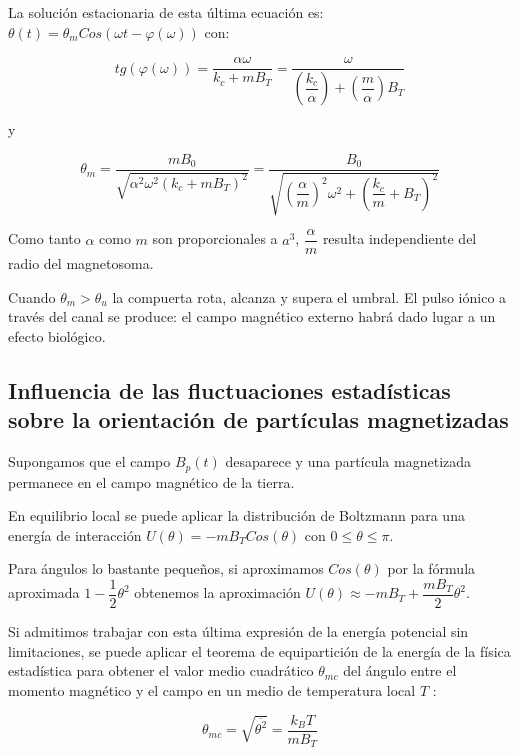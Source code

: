 La solución estacionaria de esta última ecuación es: $\theta(t)=\theta_{m}Cos(\omega t - \varphi(\omega))$ con:

\begin{equation*}
	\label{eq:64}
	tg\left(\varphi(\omega) \right) = \dfrac{\alpha\omega}{k_{c}+mB_{T}}
	=\dfrac{\omega}{\left( \dfrac{k_{c}}{\alpha}\right) +\left( \dfrac{m}{\alpha}\right) B_{T}}
\end{equation*}

y

\begin{equation*}
	\label{eq:65}
	\theta_{m} = \dfrac{mB_{0}}{\sqrt{\alpha^{2}\omega^{2}(k_{c}+mB_{T})^{2}}}
	=\dfrac{B_{0}}{\sqrt{\left( \dfrac{\alpha}{m}\right) ^{2}\omega^{2}+\left( \dfrac{k_{c}}{m}+B_{T}\right) ^{2}}}
\end{equation*}

Como tanto $\alpha$ como $m$ son proporcionales a $a^{3}$, $\dfrac{\alpha}{m}$ resulta independiente del radio del magnetosoma.

Cuando $\theta_{m}>\theta_{u}$ la compuerta rota, alcanza y supera el umbral. El pulso iónico a través del canal se produce: el campo magnético externo habrá dado lugar a un efecto biológico.


\subsection{Influencia de las fluctuaciones estadísticas sobre la orientación de partículas magnetizadas}


Supongamos que el campo $B_{p}(t)$ desaparece y una partícula magnetizada permanece en el campo magnético de la tierra.

En equilibrio local se puede aplicar la distribución de Boltzmann para una energía de interacción $U(\theta)= -mB_{T}Cos(\theta)$ con $0\leq\theta\leq\pi$.

Para ángulos lo bastante pequeños, si aproximamos $Cos(\theta)$ por la fórmula aproximada $1-\dfrac{1}{2}\theta^{2}$ obtenemos la aproximación $U(\theta)\approx -mB_{T} + \dfrac{mB_{T}}{2}\theta^{2}$.

Si admitimos trabajar con esta última expresión de la energía potencial sin limitaciones, se puede aplicar el teorema de equipartición de la energía de la física estadística para obtener el valor medio cuadrático $\theta_{mc}$ del ángulo entre el momento magnético y el campo en un medio de temperatura local $T$ :

\begin{equation}
	\label{eq:66}
	\theta_{mc} =\sqrt{\overline{\theta^{2}}} = \dfrac{k_{B}T}{mB_{T}}
\end{equation}

